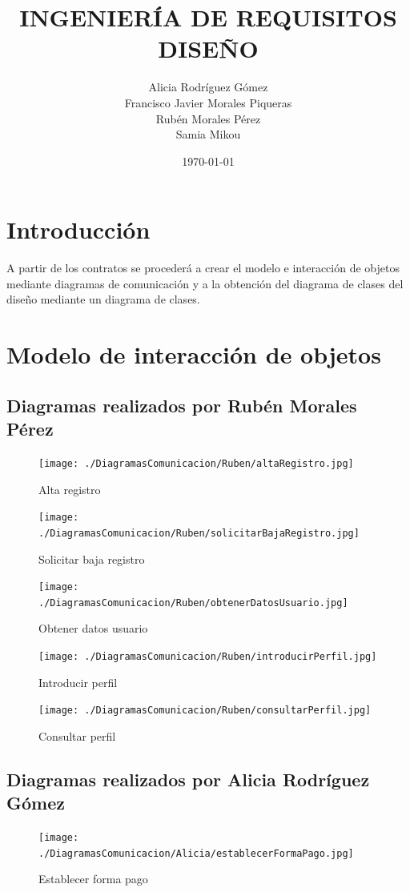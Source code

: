 \documentclass[11pt,spanish]{article} %
\title{INGENIERÍA DE REQUISITOS \\
	DISEÑO}
\author{Alicia Rodríguez Gómez \\
	Francisco Javier Morales Piqueras \\
	Rubén Morales Pérez \\
	Samia Mikou}
\date{\today}
\begin{document}
\maketitle
\tableofcontents %
\setlength\parindent{0pt} %

\newpage

\section{Introducción}
A partir de los contratos se procederá a crear el modelo e interacción de objetos mediante diagramas de comunicación y a la obtención del diagrama de clases del diseño mediante un diagrama de clases.



\section{Modelo de interacción de objetos}
\subsection{Diagramas realizados por Rubén Morales Pérez}
\begin{figure}[H]
	\texttt{[image: ./DiagramasComunicacion/Ruben/altaRegistro.jpg]}
	\caption{Alta registro}
\end{figure}

\begin{figure}[H]
	\texttt{[image: ./DiagramasComunicacion/Ruben/solicitarBajaRegistro.jpg]}
	\caption{Solicitar baja registro}
\end{figure}

\begin{figure}[H]
	\texttt{[image: ./DiagramasComunicacion/Ruben/obtenerDatosUsuario.jpg]}
	\caption{Obtener datos usuario}
\end{figure}

\begin{figure}[H]
	\texttt{[image: ./DiagramasComunicacion/Ruben/introducirPerfil.jpg]}
	\caption{Introducir perfil}
\end{figure}


\begin{figure}[H]
	\texttt{[image: ./DiagramasComunicacion/Ruben/consultarPerfil.jpg]}
	\caption{Consultar perfil}
\end{figure}
\newpage


\subsection{Diagramas realizados por Alicia Rodríguez Gómez}
\begin{figure}[H]
	\texttt{[image: ./DiagramasComunicacion/Alicia/establecerFormaPago.jpg]}
	\caption{Establecer forma pago}
\end{figure}
\end{document}
